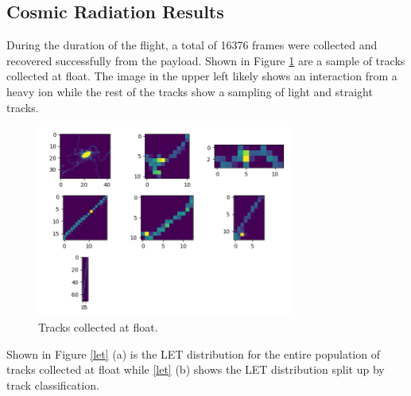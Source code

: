 \subsection{Cosmic Radiation Results}
\label{sec:Cosmic-Radiation-Results}

During the duration of the flight, a total of 16376 frames were collected and recovered successfully from the payload. Shown in Figure \ref{tracks} are a sample of tracks collected at float. The image in the upper left likely shows an interaction from a heavy ion while the rest of the tracks show a sampling of light and straight tracks. 


\begin{figure}[H]
	\begin{center}
	\includegraphics[width=0.75\textwidth]{figures/tracks.png}
	\caption{Tracks collected at float.}
	\label{tracks}
	\end{center}
\end{figure}

Shown in Figure \ref{let} (a) is the LET distribution for the entire population of tracks collected at float while \ref{let} (b) shows the LET distribution split up by track classification.

